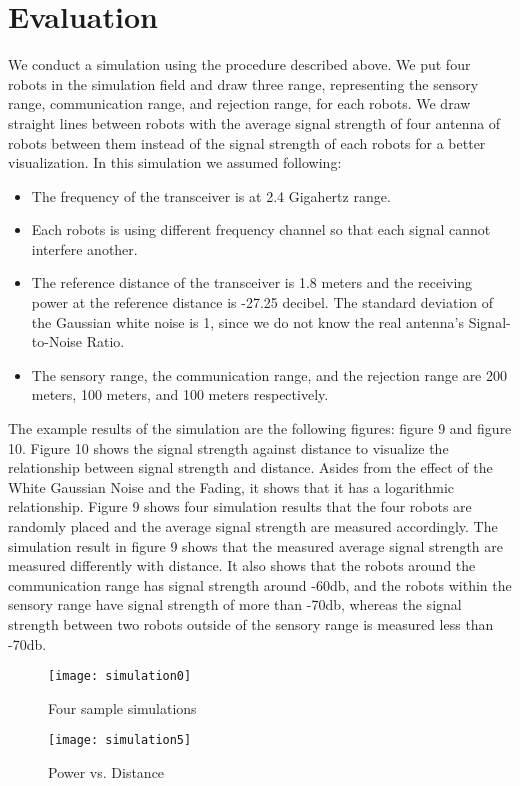\section{Evaluation}
\label{sec:evaluation}
\label{Simulation Result}
\indent 
	We conduct a simulation using the procedure described above. We put four robots in the simulation field and draw three range, representing the sensory range, communication range, and rejection range, for each robots. We draw straight lines between robots with the average signal strength of four antenna of robots between them instead of the signal strength of each robots for a better visualization. In this simulation we assumed following:
\begin{itemize}
	\item The frequency of the transceiver is at 2.4 Gigahertz range.
	\item Each robots is using different frequency channel so that each signal cannot interfere another.
	\item The reference distance of the transceiver is 1.8 meters and the receiving power at the reference distance is -27.25 decibel. The standard deviation of the Gaussian white noise is 1, since we do not know the real antenna's Signal-to-Noise Ratio.
	\item The sensory range, the communication range, and the rejection range are 200 meters, 100 meters, and 100 meters respectively.
\end{itemize}
\par
	The example results of the simulation are the following figures: figure 9 and figure 10. Figure 10 shows the signal strength against distance to visualize the relationship between signal strength and distance. Asides from the effect of the White Gaussian Noise and the Fading, it shows that it has a logarithmic relationship. Figure 9 shows four simulation results that the four robots are randomly placed and the average signal strength are measured accordingly. The simulation result in figure 9 shows that the measured average signal strength are measured differently with distance. It also shows that the robots around the communication range has signal strength around -60db, and the robots within the sensory range have signal strength of more than -70db, whereas the signal strength between two robots outside of the sensory range is measured less than -70db. \\
 
\begin{figure}[ht]
	\centering
	\texttt{[image: simulation0]}
	\caption{Four sample simulations}
	\end{figure}
	
\begin{figure}[ht]
	\centering
	\texttt{[image: simulation5]}
	\caption{Power vs. Distance}
	\end{figure}
	


